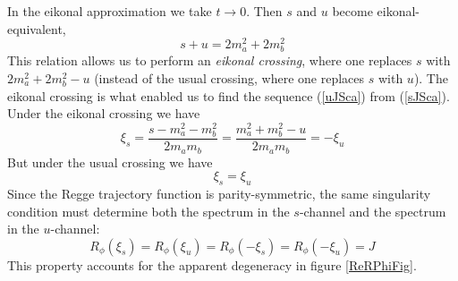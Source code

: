 In the eikonal approximation we take $t \rightarrow 0$. Then $s$ and $u$ become eikonal-equivalent,
\begin{equation}
	s + u = 2m_{a}^{2} + 2m_{b}^{2}
\end{equation}
This relation allows us to perform an \textit{eikonal crossing}, where one replaces $s$ with $2m_{a}^{2} + 2m_{b}^{2} - u$ (instead of the usual crossing, where one replaces $s$ with $u$). The eikonal crossing is what enabled us to find the sequence (\ref{uJSca}) from (\ref{sJSca}). Under the eikonal crossing we have
\begin{equation}
	\xi_{s} = \frac{s - m_{a}^{2} - m_{b}^{2}}{2m_{a} m_{b}} = \frac{m_{a}^{2} + m_{b}^{2} - u}{2 m_{a} m_{b}} = - \xi_{u}
\end{equation}
But under the usual crossing we have
\begin{equation}
	\xi_{s} = \xi_{u}
\end{equation}
Since the Regge trajectory function is parity-symmetric, the same singularity condition must determine both the spectrum in the $s$-channel and the spectrum in the $u$-channel:
\begin{equation}
	R_{\phi}(\xi_{s}) = R_{\phi}(\xi_{u}) = R_{\phi}(-\xi_{s}) = R_{\phi}(-\xi_{u}) = J
\end{equation}
This property accounts for the apparent degeneracy in figure \ref{ReRPhiFig}.
